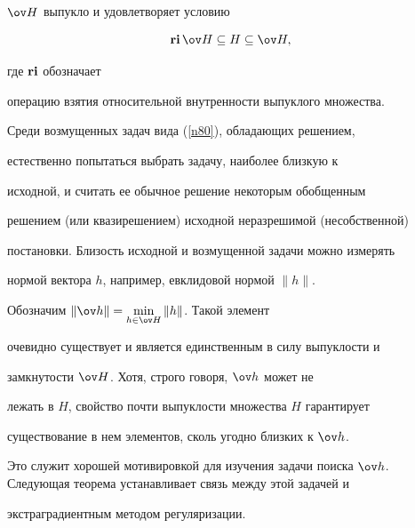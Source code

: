 $\ov H$ выпукло и удовлетворяет условию


$$


\bold{ri}\,\ov


H\subseteq H\subseteq \ov H,


$$


где $\bold{ri}$ обозначает


операцию взятия относительной внутренности выпуклого множества.





Среди возмущенных задач вида (\ref{n80}), обладающих решением,


естественно попытаться выбрать задачу, наиболее близкую к


исходной, и считать ее обычное решение некоторым обобщенным


решением (или квазирешением) исходной неразрешимой (несобственной)


постановки. Близость исходной и возмущенной задачи можно измерять


нормой вектора $h$, например, евклидовой нормой $\|h\|$.





Обозначим $\|\ov h\|=\min\limits_{h\in\ov H} \|h\|$. Такой элемент


очевидно существует и является единственным в силу выпуклости и


замкнутости $\ov H$. Хотя, строго говоря, $\ov h$ может не


лежать в $H$, свойство почти выпуклости множества $H$ гарантирует


существование в нем элементов, сколь угодно близких к $\ov h$.


Это служит хорошей мотивировкой для изучения задачи поиска $\ov


h$. Следующая теорема устанавливает связь между этой задачей и


экстраградиентным методом регуляризации.





